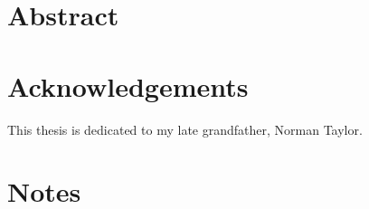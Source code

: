 \documentclass[11pt]{report}
\begin{document}


\section*{Abstract}

\section*{Acknowledgements}
This thesis is dedicated to my late grandfather, Norman Taylor.


\section*{Notes}

\setcounter{tocdepth}{3}
\tableofcontents

\setcounter{tocdepth}{1}
\listoffigures





\appendix


{}
\end{document}
